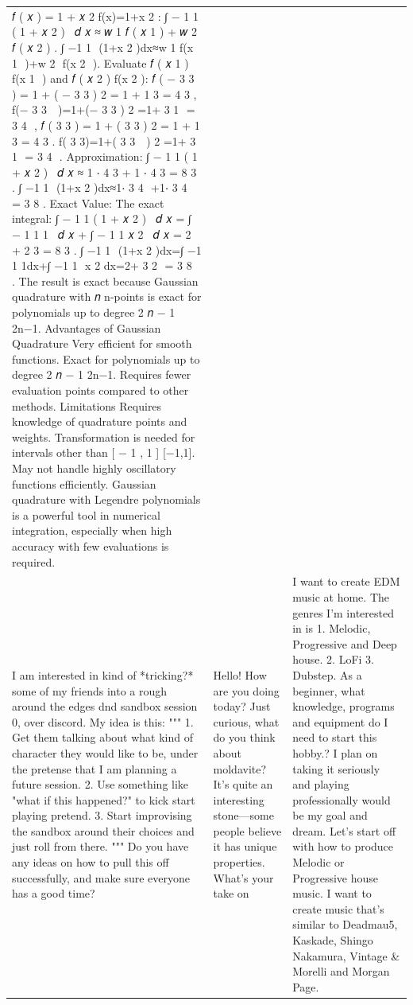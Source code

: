 \begin{table}[ht]
\begin{tabular}{p{4.3cm}p{4.3cm}p{4.3cm}}
 𝑓 ( 𝑥 ) = 1 + 𝑥 2 f(x)=1+x  2  :  ∫ − 1 1 ( 1 + 𝑥 2 )   𝑑 𝑥 ≈ 𝑤 1 𝑓 ( 𝑥 1 ) + 𝑤 2 𝑓 ( 𝑥 2 ) . ∫  −1 1 ​  (1+x  2  )dx≈w  1 ​  f(x  1 ​  )+w  2 ​  f(x  2 ​  ). Evaluate  𝑓 ( 𝑥 1 ) f(x  1 ​  ) and  𝑓 ( 𝑥 2 ) f(x  2 ​  ):  𝑓 ( − 3 3 ) = 1 + ( − 3 3 ) 2 = 1 + 1 3 = 4 3 , f(−  3 3 ​   ​  )=1+(−  3 3 ​   ​  )  2  =1+  3 1 ​  =  3 4 ​  , 𝑓 ( 3 3 ) = 1 + ( 3 3 ) 2 = 1 + 1 3 = 4 3 . f(  3 3 ​   ​  )=1+(  3 3 ​   ​  )  2  =1+  3 1 ​  =  3 4 ​  . Approximation:  ∫ − 1 1 ( 1 + 𝑥 2 )   𝑑 𝑥 ≈ 1 ⋅ 4 3 + 1 ⋅ 4 3 = 8 3 . ∫  −1 1 ​  (1+x  2  )dx≈1⋅  3 4 ​  +1⋅  3 4 ​  =  3 8 ​  . Exact Value: The exact integral:  ∫ − 1 1 ( 1 + 𝑥 2 )   𝑑 𝑥 = ∫ − 1 1 1   𝑑 𝑥 + ∫ − 1 1 𝑥 2   𝑑 𝑥 = 2 + 2 3 = 8 3 . ∫  −1 1 ​  (1+x  2  )dx=∫  −1 1 ​  1dx+∫  −1 1 ​  x  2  dx=2+  3 2 ​  =  3 8 ​  . The result is exact because Gaussian quadrature with  𝑛 n-points is exact for polynomials up to degree  2 𝑛 − 1 2n−1.  Advantages of Gaussian Quadrature Very efficient for smooth functions. Exact for polynomials up to degree  2 𝑛 − 1 2n−1. Requires fewer evaluation points compared to other methods. Limitations Requires knowledge of quadrature points and weights. Transformation is needed for intervals other than  [ − 1 , 1 ] [−1,1]. May not handle highly oscillatory functions efficiently. Gaussian quadrature with Legendre polynomials is a powerful tool in numerical integration, especially when high accuracy with few evaluations is required. \\[4pt]
I am interested in kind of *tricking?* some of my friends into a rough around the edges dnd sandbox session 0, over discord.  My idea is this: """ 1. Get them talking about what kind of character they would like to be, under the pretense that I am planning a future session.  2. Use something like "what if this happened?" to kick start playing pretend.  3. Start improvising the sandbox around their choices  and just roll from there. """  Do you have any ideas on how to pull this off successfully, and make sure everyone has a good time? & Hello! How are you doing today? Just curious, what do you think about moldavite? It's quite an interesting stone—some people believe it has unique properties. What’s your take on & I want to create EDM music at home. The genres I'm interested in is 1. Melodic, Progressive and Deep house. 2. LoFi 3. Dubstep.  As a beginner, what knowledge, programs and equipment do I need to start this hobby.? I plan on taking it seriously and playing professionally would be my goal and dream. Let's start off with how to produce Melodic or Progressive house music. I want to create music that's similar to Deadmau5, Kaskade, Shingo Nakamura, Vintage \& Morelli and Morgan Page. \\[4pt]

\end{tabular}
\end{table}
